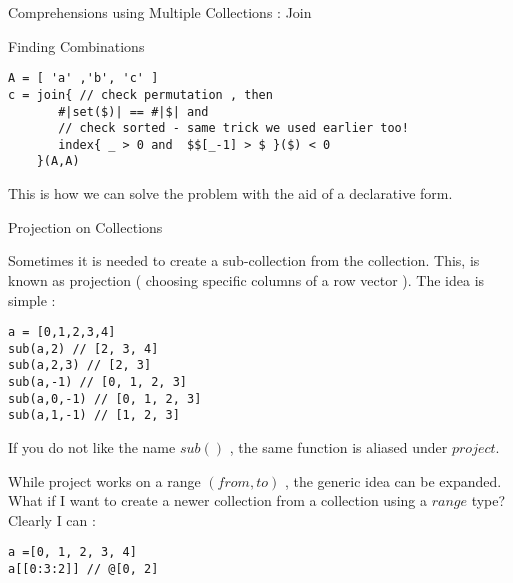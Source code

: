 \begin{section}{Comprehensions using Multiple Collections : Join}
\begin{subsection}{Finding Combinations}
\begin{lstlisting}[style=JexlStyle]
A = [ 'a' ,'b', 'c' ] 
c = join{ // check permutation , then 
       #|set($)| == #|$| and 
       // check sorted - same trick we used earlier too!      
       index{ _ > 0 and  $$[_-1] > $ }($) < 0 
    }(A,A)
\end{lstlisting}
This is how we can solve the problem with the aid of a declarative form. 
\end{subsection}

\begin{subsection}{Projection on Collections}

Sometimes it is needed to create a sub-collection from the collection. 
This, is known as projection ( choosing specific columns of a row vector ).
The idea is simple :

\begin{lstlisting}[style=JexlStyle]
a = [0,1,2,3,4]
sub(a,2) // [2, 3, 4]
sub(a,2,3) // [2, 3]
sub(a,-1) // [0, 1, 2, 3]
sub(a,0,-1) // [0, 1, 2, 3]
sub(a,1,-1) // [1, 2, 3]
\end{lstlisting}
If you do not like the name $sub()$ , the same function is aliased under $project$.

While project works on a range $(from,to)$ , the generic idea can be expanded. 
What if I want to create a newer collection from a collection using a $range$ type? 
Clearly I can : 

\begin{lstlisting}[style=JexlStyle]
a =[0, 1, 2, 3, 4]
a[[0:3:2]] // @[0, 2]
\end{lstlisting}

\end{subsection}

\end{section}

